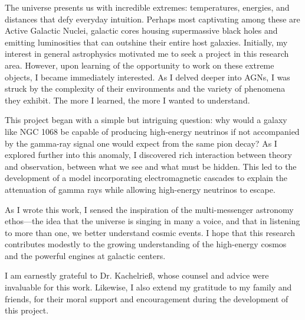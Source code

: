 The universe presents us with incredible extremes: temperatures, energies, and distances that defy everyday intuition. Perhaps most captivating among these are Active Galactic Nuclei, galactic cores housing supermassive black holes and emitting luminosities that can outshine their entire host galaxies. Initially, my interest in general astrophysics motivated me to seek a project in this research area. However, upon learning of the opportunity to work on these extreme objects, I became immediately interested. As I delved deeper into AGNs, I was struck by the complexity of their environments and the variety of phenomena they exhibit. The more I learned, the more I wanted to understand.

This project began with a simple but intriguing question: why would a galaxy like NGC 1068 be capable of producing high-energy neutrinos if not accompanied by the gamma-ray signal one would expect from the same pion decay? As I explored further into this anomaly, I discovered rich interaction between theory and observation, between what we see and what must be hidden. This led to the development of a model incorporating electromagnetic cascades to explain the attenuation of gamma rays while allowing high-energy neutrinos to escape.

As I wrote this work, I sensed the inspiration of the multi-messenger astronomy ethos—the idea that the universe is singing in many a voice, and that in listening to more than one, we better understand cosmic events. I hope that this research contributes modestly to the growing understanding of the high-energy cosmos and the powerful engines at galactic centers.

I am earnestly grateful to Dr. Kachelrie\ss, whose counsel and advice were invaluable for this work. Likewise, I also extend my gratitude to my family and friends, for their moral support and encouragement during the development of this project.